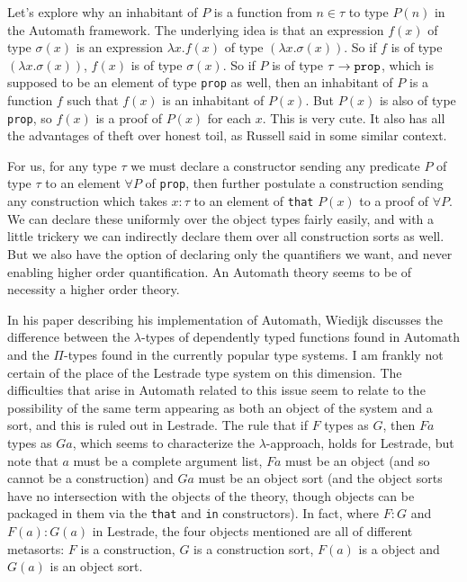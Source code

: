 \documentclass[12pt]{article}
\begin{document}
Let's explore why an inhabitant of $P$ is a function from $n \in \tau$ to type $P(n)$ in the Automath framework.  The underlying idea is that an expression $f(x)$ of type $\sigma(x)$  is an expression
$\lambda x.f(x)$ of type $(\lambda x.\sigma( x))$.  So if $f$ is of type $(\lambda x.\sigma(x))$, $f(x)$ is of type $\sigma(x)$.  So if $P$ is of type $\tau \rightarrow {\tt prop}$,
which is supposed to be an element of type {\tt prop} as well, then an inhabitant of $P$ is a function $f$ such that $f(x)$ is an inhabitant of $P(x)$.  But $P(x)$ is also of type
{\tt prop}, so $f(x)$ is a proof of $P(x)$ for each $x$.   This is very cute.  It also has all the advantages of theft over honest toil, as Russell said in some similar context.

For us, for any type $\tau$ we must  declare a constructor sending any predicate $P$ of type $\tau$ to an element $\forall P$ of {\tt prop}, then further postulate
a construction sending any construction which takes $x : \tau$ to an element of {\tt that} $P(x)$ to a proof of $\forall P$.  We can declare these uniformly over the object types
fairly easily, and with a little trickery we can indirectly declare them over all construction sorts as well.  But we also have the option of declaring only the quantifiers we want,
and never enabling higher order quantification.  An Automath theory seems to be of necessity a higher order theory.

In his paper \cite{aut} describing his implementation \cite{freek} of Automath, Wiedijk discusses the difference between the $\lambda$-types of dependently typed functions
found in Automath and the $\Pi$-types found in the currently popular type systems.  I am frankly not certain of the place of the Lestrade type system on this dimension.  The difficulties that arise in Automath related to this issue seem to relate to the possibility of the same term appearing as both an object of the system and a sort, and this is ruled out in Lestrade.
The rule that if $F$ types as $G$, then $Fa$ types as $Ga$, which seems to characterize the $\lambda$-approach, holds for Lestrade, but note that $a$ must be a complete argument list,
$Fa$ must be an object (and so cannot be a construction) and $Ga$ must be an object sort (and the object sorts have no intersection with the objects of the theory, though objects can be packaged in them via the {\tt that} and {\tt in} constructors).  In fact, where $F:G$ and $F(a):G(a)$ in Lestrade, the four objects mentioned are all of different metasorts:  $F$ is a construction,
$G$ is a construction sort, $F(a)$ is a object and $G(a)$ is an object sort.
\end{document}
